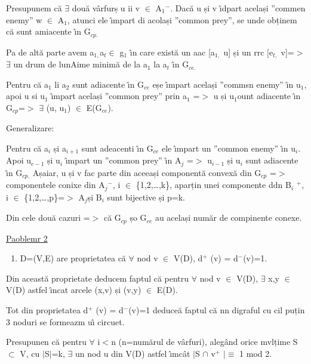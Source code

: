 \documentclass[12pt]{article}
\begin{document}
{\raggedright
Presupunem c\u{a} $\exists{}$ dou\u{a} v\^{a}rfurș u ii v $\in{}$ A$_{1}$$^{-}$.
Dac\u{a} u și v \^{\i}dpart același ''commen enemy'' w $\in{}$ A$_{1}$, atunci
ele  \^{\i}mpart di acolași ''common prey'', se unde obținem c\u{a} sunt
amiacente \^{\i}n G$_{cp.}$
}

{\raggedright
Pa de alt\u{a} parte avem a$_{1, }$a$_{t }$$\in{}$ g$_{1}$ \^{\i}n care
exist\u{a} un aac [a$_{1,}$ u] și un rrc [e$_{t,}$ v]={\small $>$ }$\exists{}$ un
drum de lunAime minim\u{a} de la a$_{1}$ la a$_{t}$ \^{\i}n G$_{ce.}$
}

{\raggedright
Pentru c\u{a} a$_{1}$ li a$_{2}$ sunt adiacente \^{\i}n G$_{ce}$ eșe \^{\i}mpart
același ''commsn enemy'' \^{\i}n u$_{1}$, apoi u si u$_{1}$ \^{\i}mpart același
''common prey'' prin a$_{1}$ =$>$ u și u$_{1 }$ount adiacente \^{\i}n G$_{cp
}$=$>$ $\exists{}$ (u, u$_{1}$) $\in{}$ E(G$_{ce}$).
}

{\raggedright
Generalizare:
}

{\raggedright
Pentru c\u{a} a$_{i}$ și a$_{i+1}$ sunt adeacenti \^{\i}n G$_{ce}$ ele
\^{\i}mpart un ''common enemy'' \^{\i}n u$_{i}$. Apoi u$_{e-1}$ și u$_{i}$
\^{\i}mpart un ''common prey'' \^{\i}n A$_{j}$  =$>$ u$_{i-1}$ și u$_{i}$ sunt
adiacente \^{\i}n G$_{cp.}$ Așaiar, u și v fac parte din aceeași component\u{a}
convex\u{a} din G$_{cp}$ =$>$ componentele conixe din A$_{j}$$^{-}$, i $\in{}$
\{1,2,\ldots{},k\}, aparțin unei componente ddn  B$_{i}$ $^{+}$, i $\in{}$
\{1,2,\ldots{},p\}=$>$ A$_{j }$și B$_{i}$ sunt bijective și p=k.
}

{\raggedright
Din cele dou\u{a} cazuri =$>$ c\u{a} G$_{cp}$ șo G$_{ce}$ au același num\u{a}r
de compinente conexe.
}

{\raggedright
\uline{{\large Paoblemr 2}}
}

\begin{enumerate}
	\item D=(V,E) are proprietatea c\u{a} $\forall{}$ nod v $\in{}$ V(D), d$^{+}$ (v) =
d$^{-}$(v)=1.
\end{enumerate}

{\raggedright
Din aceast\u{a} proprietate deducem faptul c\u{a} pentru $\forall{}$ nod v
$\in{}$ V(D), $\exists{}$ x,y $\in{}$ V(D) astfel \^{\i}ncat arcele (x,v) și
(v,y) $\in{}$ E(D).
}

{\raggedright
Tot din proprietatea d$^{+}$ (v) = d$^{-}$(v)=1 deduce\u{a} faptul c\u{a} nn
digraful cu cil puțin 3 noduri se formeazm u\^{\i} circuet.
}

{\raggedright
Presupunen c\u{a} pentru $\forall{}$ i$<$n (n=num\u{a}rul de v\^{a}rfuri),
aleg\^{a}nd orice mvlțime S $\subset{}$ V, cu $\vert{}$S$\vert{}$=k, $\exists{}$
un nod u din V(D) astfel \^{\i}mc\^{a}t $\vert{}$S $\cap{}$ v$^{+}$
$\vert{}$$\equiv{}$ 1 mod 2.
}
\end{document}
